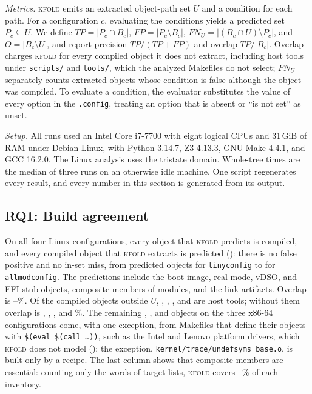 \documentclass[acmsmall,screen,review]{acmart}
\newcommand{\tool}{\textsc{kfold}\xspace}
\begin{document}
\emph{Metrics.} \tool emits an extracted object-path set $U$ and a condition for each path. For a configuration $c$, evaluating the conditions yields a predicted set $P_c\subseteq U$. We define $TP=|P_c\cap B_c|$, $FP=|P_c\setminus B_c|$, $FN_U=|(B_c\cap U)\setminus P_c|$, and $O=|B_c\setminus U|$, and report precision $TP/(TP+FP)$ and overlap $TP/|B_c|$. Overlap charges \tool for every compiled object it does not extract, including host tools under \texttt{scripts/} and \texttt{tools/}, which the analyzed Makefiles do not select; $FN_U$ separately counts extracted objects whose condition is false although the object was compiled. To evaluate a condition, the evaluator substitutes the value of every option in the \texttt{.config}, treating an option that is absent or ``is not set'' as unset.

\emph{Setup.} All runs used an Intel Core i7-7700 with eight logical CPUs and 31\,GiB of RAM under Debian Linux, with Python 3.14.7, Z3 4.13.3, GNU Make 4.4.1, and GCC 16.2.0. The Linux analysis uses the tristate domain. Whole-tree times are the median of three runs on an otherwise idle machine. One script regenerates every result, and every number in this section is generated from its output.

\subsection{RQ1: Build agreement}
\label{sec:eval:agreement}
On all four Linux configurations, every object that \tool predicts is compiled, and every compiled object that \tool extracts is predicted (): there is no false positive and no in-set miss, from \NLinuxTinyconfigPred predicted objects for \texttt{tinyconfig} to \NLinuxAllmodconfigPred for \texttt{allmodconfig}. The predictions include the boot image, real-mode, vDSO, and EFI-stub objects, composite members of modules, and the link artifacts. Overlap is \NLinuxTinyconfigOverlap--\NLinuxAllmodconfigOverlap\%. Of the compiled objects outside $U$, \NLinuxTinyconfigOuthost, \NLinuxDefconfigOuthost, \NLinuxDebianOuthost, and \NLinuxAllmodconfigOuthost are host tools; without them overlap is \NLinuxTinyconfigOverlapnohost, \NLinuxDefconfigOverlapnohost, \NLinuxDebianOverlapnohost, and \NLinuxAllmodconfigOverlapnohost\%. The remaining \NLinuxDefconfigOuttarget, \NLinuxDebianOuttarget, and \NLinuxAllmodconfigOuttarget objects on the three x86-64 configurations come, with one exception, from Makefiles that define their objects with \texttt{\$(eval \$(call \ldots))}, such as the Intel and Lenovo platform drivers, which \tool does not model (); the exception, \texttt{kernel/trace/undefsyms\_base.o}, is built only by a recipe. The last column shows that composite members are essential: counting only the words of target lists, \tool covers \NLinuxDebianTargetsoverlap--\NLinuxTinyconfigTargetsoverlap\% of each inventory.
\end{document}
